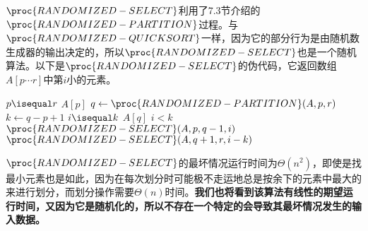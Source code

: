 \documentclass[a4paper,11pt]{ctexbook}
\begin{document}
$ \proc{RANDOMIZED-SELECT} $利用了7.3节介绍的$ \proc{RANDOMIZED-PARTITION} $过程。与$\proc{RANDOMIZED-QUICKSORT}$一样，因为它的部分行为是由随机数生成器的输出决定的，所以$ \proc{RANDOMIZED-SELECT} $也是一个随机算法。以下是$ \proc{RANDOMIZED-SELECT} $的伪代码，它返回数组$ A[p \cdots r] $中第$ i $小的元素。

\begin{codebox}
	\li \If $ p \isequal r $
	\li \Then
			\Return $ A[p] $
		\End
	\li $ q \gets \proc{RANDOMIZED-PARTITION}(A,p,r) $
	\li $ k \gets q-p+1 $
	\li \If $ i \isequal k $
	\li	\Then \Return $ A[q] $
	\li	\ElseIf $ i < k $
	\li	\Then \Return $ \proc{RANDOMIZED-SELECT}(A,p,q-1,i)$
	\li \Else \Return $ \proc{RANDOMIZED-SELECT}(A,q+1,r,i-k) $		
		\End
	
\end{codebox}

$ \proc{RANDOMIZED-SELECT} $的最坏情况运行时间为$ \Theta(n^2) $，即使是找最小元素也是如此，因为在每次划分时可能极不走运地总是按余下的元素中最大的来进行划分，而划分操作需要$ \Theta(n)$时间。\textbf{我们也将看到该算法有线性的期望运行时间，又因为它是随机化的，所以不存在一个特定的会导致其最坏情况发生的输入数据。}
\end{document}
